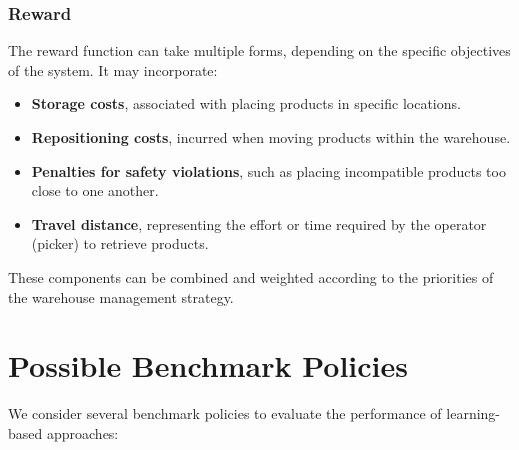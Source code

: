 \documentclass[a4paper,twoside,11pt]{article}
\begin{document}
\subsubsection*{Reward}

The reward function can take multiple forms, depending on the specific objectives of the system. It may incorporate:

\begin{itemize}
    \item \textbf{Storage costs}, associated with placing products in specific locations.
    \item \textbf{Repositioning costs}, incurred when moving products within the warehouse.
    \item \textbf{Penalties for safety violations}, such as placing incompatible products too close to one another.
    \item \textbf{Travel distance}, representing the effort or time required by the operator (picker) to retrieve products.
\end{itemize}

These components can be combined and weighted according to the priorities of the warehouse management strategy.


\section{Possible Benchmark Policies}

We consider several benchmark policies to evaluate the performance of learning-based approaches:
\end{document}
